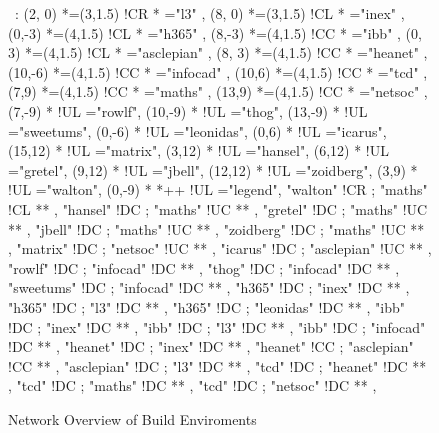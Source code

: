 
\begin{figure}

\begin{center}

\ \xy<1cm,0cm>:
(2, 0)  	*=(3,1.5) !CR  						*\frm{-} ="l3" , 
(8, 0)  	*=(3,1.5) !CL  							*\frm{-} ="inex" , 
(0,-3) 	*=(4,1.5) !CL  					*\frm{-} ="h365" , 
(8,-3) 	*=(4,1.5) !CC  			*\frm{-} ="ibb" , 
(0, 3)  	*=(4,1.5) !CL  					*\frm{-} ="asclepian" , 
(8, 3)  	*=(4,1.5) !CC  						*\frm{-} ="heanet" , 
(10,-6)  *=(4,1.5) !CC  						*\frm{-} ="infocad" , 
(10,6)  	*=(4,1.5) !CC  			*\frm{-} ="tcd" , 
(7,9)  	*=(4,1.5) !CC  *\frm{-} ="maths" , 
(13,9)  	*=(4,1.5) !CC  						*\frm{-} ="netsoc" , 
%
\POS (7,-9) * !UL ="rowlf",
\POS (10,-9) * !UL ="thog",
\POS (13,-9) * !UL ="sweetums",
%
\POS (0,-6) * !UL ="leonidas",
%
\POS (0,6) * !UL ="icarus",
%
\POS (15,12) * !UL ="matrix",
%
\POS (3,12) * !UL ="hansel",
\POS (6,12) * !UL ="gretel",
\POS (9,12) * !UL ="jbell",
\POS (12,12) * !UL ="zoidberg",
\POS (3,9) * !UL ="walton",
%
\POS (0,-9) * *++\frm{-} !UL ="legend",
%
"walton" 	!CR ; "maths" 		!CL **\dir{=} ,
"hansel" 	!DC ; "maths" 		!UC **\dir{=} ,
"gretel" 	!DC ; "maths" 		!UC **\dir{=} ,
"jbell"  	!DC ; "maths" 		!UC **\dir{=} ,
"zoidberg"  !DC ; "maths" 		!UC **\dir{=} ,
%
"matrix"  	!DC ; "netsoc" 	!UC **\dir{-} ,
%
"icarus"  	!DC ; "asclepian" !UC **\dir{=} ,
%
"rowlf"  	!DC ; "infocad" 	!DC **\dir{=} ,
"thog"	  	!DC ; "infocad" 	!DC **\dir{=} ,
"sweetums" 	!DC ; "infocad" 	!DC **\dir{=} ,
%
"h365" 		!DC ; "inex" 		!DC **\dir{-} ,
"h365" 		!DC ; "l3" 			!DC **\dir{-} ,
"h365" 		!DC ; "leonidas" 	!DC **\dir{=} ,
%
"ibb" 		!DC ; "inex" 		!DC **\dir{-} ,
"ibb" 		!DC ; "l3" 			!DC **\dir{-} ,
"ibb" 		!DC ; "infocad" 	!DC **\dir{-} ,
%
"heanet" 	!DC ; "inex" 		!DC **\dir{=} ,
"heanet" 	!CC ; "asclepian" !CC **\dir{=} ,
%
"asclepian" !DC ; "l3" 			!DC **\dir{-} ,
%
"tcd" 		!DC ; "heanet" 	!DC **\dir{=} ,
"tcd" 		!DC ; "maths" 		!DC **\dir{=} ,
"tcd" 		!DC ; "netsoc" 	!DC **\dir{=} ,
\endxy

\end{center}

\caption{Network Overview of Build Enviroments}

\end{figure}
